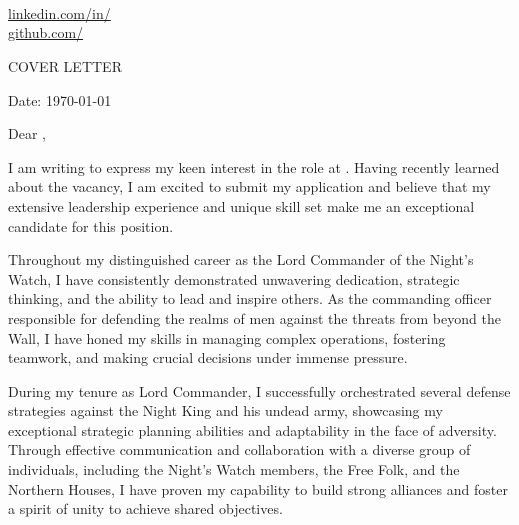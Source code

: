 \documentclass[11pt,a4]{article}
\begin{document}
\begin{center}
    \begin{minipage}[b]{0.24\textwidth}
            \large \phone \\
            \large \href{mailto:\email}{\email}
    \end{minipage}%
    \begin{minipage}[b]{0.5\textwidth}
            \centering
            {\Huge \name} \\ %
            \vspace{0.1cm}
            {\color{UI_blue} \Large{\currentjob}} \\
    \end{minipage}%
    \begin{minipage}[b]{0.24\textwidth}
            \flushright \large
            {\href{https://www.linkedin.com/in/\linkedin}{linkedin.com/in/\linkedin} } \\
            \href{https://https://github.com/\github}{github.com/\github}
    \end{minipage}

\vspace{-0.15cm}
{\color{UI_blue} \hrulefill}
\end{center}

\justify
\setlength{\parindent}{0pt}
\setlength{\parskip}{12pt}
\vspace{0.2cm}
\begin{center}
    {\color{UI_blue} \Large{COVER LETTER}}
\end{center}

Date: \today \par \vspace{-0.1cm}
Dear \recipient{},

I am writing to express my keen interest in the \position{} role at \company{}. Having recently learned about the vacancy, I am excited to submit my application and believe that my extensive leadership experience and unique skill set make me an exceptional candidate for this position.

Throughout my distinguished career as the Lord Commander of the Night's Watch, I have consistently demonstrated unwavering dedication, strategic thinking, and the ability to lead and inspire others. As the commanding officer responsible for defending the realms of men against the threats from beyond the Wall, I have honed my skills in managing complex operations, fostering teamwork, and making crucial decisions under immense pressure.

During my tenure as Lord Commander, I successfully orchestrated several defense strategies against the Night King and his undead army, showcasing my exceptional strategic planning abilities and adaptability in the face of adversity. Through effective communication and collaboration with a diverse group of individuals, including the Night's Watch members, the Free Folk, and the Northern Houses, I have proven my capability to build strong alliances and foster a spirit of unity to achieve shared objectives.
\end{document}
